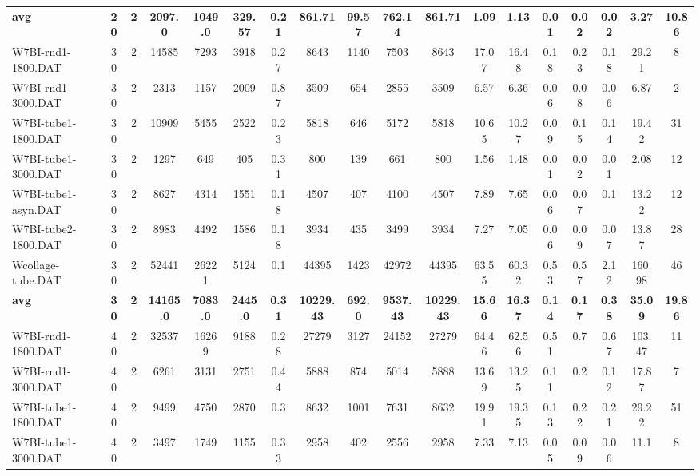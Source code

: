 \begin{sidewaystable}[h]
{\begin{tabular}{lccccccccccccccccc}
\cline{1-18} \textbf{avg} & \textbf{20} & \textbf{2} & \textbf{2097.0} & \textbf{1049.0} & \textbf{329.57} & \textbf{0.21} & \textbf{861.71} & \textbf{99.57} & \textbf{762.14} & \textbf{861.71} & \textbf{1.09} & \textbf{1.13} & \textbf{0.01} & \textbf{0.02} & \textbf{0.02} & \textbf{3.27} & \textbf{10.86} \\ \cline{1-18}
W7BI-rnd1-1800.DAT & 30 & 2 & 14585 & 7293 & 3918 & 0.27 & 8643 & 1140 & 7503 & 8643 & 17.07 & 16.48 & 0.18 & 0.23 & 0.18 & 29.21 & 8\\
W7BI-rnd1-3000.DAT & 30 & 2 & 2313 & 1157 & 2009 & 0.87 & 3509 & 654 & 2855 & 3509 & 6.57 & 6.36 & 0.06 & 0.08 & 0.06 & 6.87 & 2\\
W7BI-tube1-1800.DAT & 30 & 2 & 10909 & 5455 & 2522 & 0.23 & 5818 & 646 & 5172 & 5818 & 10.65 & 10.27 & 0.09 & 0.15 & 0.14 & 19.42 & 31\\
W7BI-tube1-3000.DAT & 30 & 2 & 1297 & 649 & 405 & 0.31 & 800 & 139 & 661 & 800 & 1.56 & 1.48 & 0.01 & 0.02 & 0.01 & 2.08 & 12\\
W7BI-tube1-asyn.DAT & 30 & 2 & 8627 & 4314 & 1551 & 0.18 & 4507 & 407 & 4100 & 4507 & 7.89 & 7.65 & 0.06 & 0.07 & 0.1 & 13.22 & 12\\
W7BI-tube2-1800.DAT & 30 & 2 & 8983 & 4492 & 1586 & 0.18 & 3934 & 435 & 3499 & 3934 & 7.27 & 7.05 & 0.06 & 0.09 & 0.07 & 13.87 & 28\\
Wcollage-tube.DAT & 30 & 2 & 52441 & 26221 & 5124 & 0.1 & 44395 & 1423 & 42972 & 44395 & 63.55 & 60.32 & 0.53 & 0.57 & 2.12 & 160.98 & 46\\
\cline{1-18} \textbf{avg} & \textbf{30} & \textbf{2} & \textbf{14165.0} & \textbf{7083.0} & \textbf{2445.0} & \textbf{0.31} & \textbf{10229.43} & \textbf{692.0} & \textbf{9537.43} & \textbf{10229.43} & \textbf{15.66} & \textbf{16.37} & \textbf{0.14} & \textbf{0.17} & \textbf{0.38} & \textbf{35.09} & \textbf{19.86} \\ \cline{1-18}
W7BI-rnd1-1800.DAT & 40 & 2 & 32537 & 16269 & 9188 & 0.28 & 27279 & 3127 & 24152 & 27279 & 64.46 & 62.56 & 0.51 & 0.7 & 0.67 & 103.47 & 11\\
W7BI-rnd1-3000.DAT & 40 & 2 & 6261 & 3131 & 2751 & 0.44 & 5888 & 874 & 5014 & 5888 & 13.69 & 13.25 & 0.11 & 0.2 & 0.12 & 17.87 & 7\\
W7BI-tube1-1800.DAT & 40 & 2 & 9499 & 4750 & 2870 & 0.3 & 8632 & 1001 & 7631 & 8632 & 19.91 & 19.35 & 0.13 & 0.22 & 0.21 & 29.22 & 51\\
W7BI-tube1-3000.DAT & 40 & 2 & 3497 & 1749 & 1155 & 0.33 & 2958 & 402 & 2556 & 2958 & 7.33 & 7.13 & 0.05 & 0.09 & 0.06 & 11.1 & 8\\

\end{tabular}}
\end{sidewaystable}
